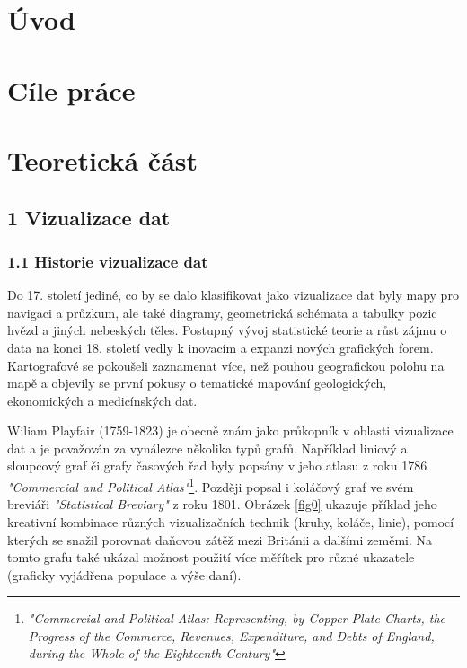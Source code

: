 \documentclass[12pt,]{article}
\title{}
\author{}
\date{}
\let\rmarkdownfootnote\footnote%
\def\footnote{\protect\rmarkdownfootnote}
\begin{document}


\tableofcontents
\newpage

\section{Úvod}\label{uvod}

\pagestyle{plain} \setcounter{page}{1}

\newpage

\section{Cíle práce}\label{cile-prace}

\newpage

\section*{Teoretická část}\label{teoreticka-cast}

\subsection{1 Vizualizace dat}\label{vizualizace-dat}

\subsubsection{1.1 Historie vizualizace
dat}\label{historie-vizualizace-dat}

\qquad Do 17. století jediné, co by se dalo klasifikovat jako
vizualizace dat byly mapy pro navigaci a průzkum, ale také diagramy,
geometrická schémata a tabulky pozic hvězd a jiných nebeských těles.
Postupný vývoj statistické teorie a růst zájmu o data na konci 18.
století vedly k inovacím a expanzi nových grafických forem. Kartografové
se pokoušeli zaznamenat více, než pouhou geografickou polohu na mapě a
objevily se první pokusy o tematické mapování geologických, ekonomických
a medicínských dat.

\qquad Wiliam Playfair (1759-1823) je obecně znám jako průkopník v
oblasti vizualizace dat a je považován za vynálezce několika typů grafů.
Například liniový a sloupcový graf či grafy časových řad byly popsány v
jeho atlasu z roku 1786
\textit{"Commercial and Political Atlas"}\footnote{\textit{"Commercial and Political Atlas: Representing, by Copper-Plate Charts, the Progress of the Commerce, Revenues, Expenditure, and Debts of England, during the Whole of the Eighteenth Century"}}.
Později popsal i koláčový graf ve svém breviáři
\textit{"Statistical Breviary"} z roku 1801. Obrázek \ref{fig0} ukazuje
příklad jeho kreativní kombinace různých vizualizačních technik (kruhy,
koláče, linie), pomocí kterých se snažil porovnat daňovou zátěž mezi
Británii a dalšími zeměmi. Na tomto grafu také ukázal možnost použití
více měřítek pro různé ukazatele (graficky vyjádřena populace a výše
daní).
\end{document}
